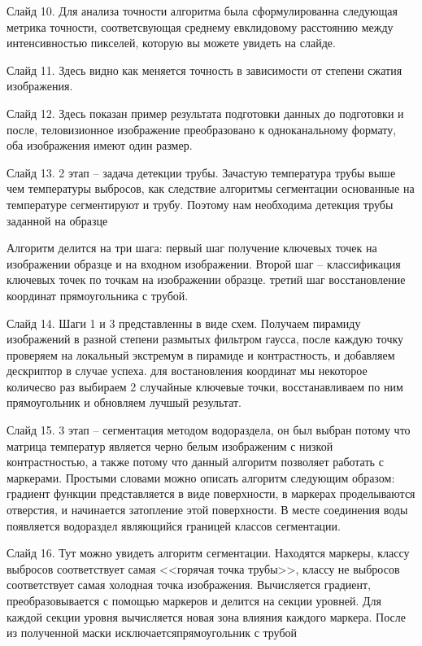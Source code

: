 \documentclass[14pt, a4paper]{extreport}
\begin{document}
	Слайд 10. Для анализа точности алгоритма была сформулированна следующая метрика точности, соответсвующая среднему евклидовому расстоянию между интенсивностью пикселей, которую вы можете увидеть на слайде. 
	
	Слайд 11. Здесь видно как меняется точность в зависимости от степени сжатия изображения.
	
	Слайд 12. Здесь показан пример результата подготовки данных до подготовки и после, теловизионное изображение преобразовано к одноканальному формату, оба изображения имеют один размер.
	
	Слайд 13. 2 этап -- задача детекции трубы. Зачастую температура трубы выше чем температуры выбросов, как следствие алгоритмы сегментации основанные на температуре сегментируют и трубу. Поэтому нам необходима детекция трубы заданной на образце
	
	Алгоритм делится на три шага: первый шаг получение ключевых точек на изображении образце и на входном изображении. Второй шаг -- классификация ключевых точек по точкам на изображении образце. третий шаг восстановление координат прямоугольника с трубой. 
	
	Слайд 14. Шаги 1 и 3 представленны в виде схем. Получаем пирамиду изображений в разной степени размытых фильтром гаусса, после каждую точку проверяем на локальный экстремум в пирамиде и контрастность, и добавляем дескриптор в случае успеха.
	для востановления координат мы некоторое количесво раз выбираем 2 случайные ключевые точки, восстанавливаем по ним прямоугольник и обновляем лучшый результат.
	
	Слайд 15. 3 этап -- сегментация методом водораздела, он был выбран потому что матрица температур является черно белым изображеним с низкой контрастностью, а также потому что данный алгоритм позволяет работать с маркерами. Простыми словами можно описать алгоритм следующим образом: градиент функции представляется в виде поверхности, в маркерах проделываются отверстия, и начинается затопление этой поверхности. В месте соединения воды появляется водораздел являющийся границей классов сегментации.
	
	Слайд 16. Тут можно увидеть алгоритм сегментации. Находятся маркеры, классу выбросов соответствует самая <<горячая точка трубы>>, классу не выбросов соответствует самая холодная точка изображения. Вычисляется градиент, преобразовывается с помощью маркеров и делится на секции уровней. Для каждой секции уровня вычисляется новая зона влияния каждого маркера. После из полученной маски исключается\linebreak прямоугольник с трубой
	
\end{document}
